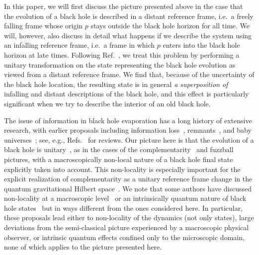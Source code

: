 \documentclass[12pt]{article}
\begin{document}
In this paper, we will first discuss the picture presented above in 
the case that the evolution of a black hole is described in a distant 
reference frame, i.e.\ a freely falling frame whose origin $p$ stays 
outside the black hole horizon for all time.  We will, however, also 
discuss in detail what happens if we describe the system using an 
infalling reference frame, i.e.\ a frame in which $p$ enters into the 
black hole horizon at late times.  Following Ref.~\cite{Nomura:2011rb}, 
we treat this problem by performing a unitary transformation on the state 
representing the black hole evolution as viewed from a distant reference 
frame.  We find that, because of the uncertainty of the black hole 
location, the resulting state is in general {\it a superposition of} 
infalling and distant descriptions of the black hole, and this effect 
is particularly significant when we try to describe the interior of 
an old black hole.

The issue of information in black hole evaporation has a long 
history of extensive research, with earlier proposals including 
information loss~\cite{Hawking:1976ra,Wald:1980nm}, 
remnants~\cite{Aharonov:1987tp,Giddings:1992hh}, 
and baby universes~\cite{Dyson:1976}; see, e.g., 
Refs.~\cite{Preskill:1992tc,Mathur:2009hf} for reviews. 
Our picture here is that the evolution of a black hole 
is unitary~\cite{'tHooft:1990fr}, as in the cases of the 
complementarity~\cite{Susskind:1993if} and fuzzball~\cite{Lunin:2001jy} 
pictures, with a macroscopically non-local nature of a black hole final 
state explicitly taken into account.  This non-locality is especially 
important for the explicit realization of complementarity as a 
unitary reference frame change in the quantum gravitational Hilbert 
space~\cite{Nomura:2011rb}.  We note that some authors have discussed 
non-locality at a macroscopic level~\cite{Giddings:1992hh,Giddings:2009ae} 
or an intrinsically quantum nature of black hole 
states~\cite{Brustein:2012jn} but in ways different 
from the ones considered here.  In particular, these proposals 
lead either to non-locality of the dynamics (not only states), 
large deviations from the semi-classical picture experienced by 
a macroscopic physical observer, or intrinsic quantum effects 
confined only to the microscopic domain, none of which applies 
to the picture presented here.
\end{document}

